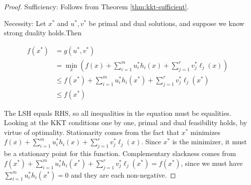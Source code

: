 \begin{proof}

    Sufficiency: Follows from Theorem \ref{thm:kkt-sufficient}.


    Necessity: Let $ x^{*} $ and $ u^{*}, v^{*} $ be primal and dual solutions, and suppose we know strong duality holds.Then

    \begin{equation}
    \begin{aligned}
    f\left(x^{*}\right) &=g\left(u^{*}, v^{*}\right) \\
    &=\min _{x}\left(f(x)+\sum_{i=1}^{m} u_{i}^{*} h_{i}(x)+\sum_{j=1}^{r} v_{j}^{*} \ell_{j}(x)\right) \\
    & \leq f\left(x^{*}\right)+\sum_{i=1}^{m} u_{i}^{*} h_{i}\left(x^{*}\right)+\sum_{j=1}^{r} v_{j}^{*} \ell_{j}\left(x^{*}\right) \\
    & \leq f\left(x^{*}\right)
    \end{aligned}
    \end{equation}

The LSH equals RHS, so all inequalities in the equation must be equalities. Looking at the KKT conditions one by one, primal and dual feasibility holds, by virtue of optimality. Stationarity comes from the fact that $ x^{*} $ minimizes $ f(x)+\sum_{i=1}^{m} u_{i}^{*} h_{i}(x)+\sum_{j=1}^{r} v_{j}^{*} \ell_{j}(x) $. Since $ x^{*} $ is the minimizer, it must be a stationary point for this function. Complementary slackness comes from $ f\left(x^{*}\right)+\sum_{i=1}^{m} u_{i}^{*} h_{i}\left(x^{*}\right)+\sum_{j=1}^{r} v_{j}^{*} \ell_{j}\left(x^{*}\right)=f\left(x^{*}\right) $, since we must have $ \sum_{i=1}^{m} u_{i}^{*} h_{i}\left(x^{*}\right)=0 $ and they are each non-negative.

\end{proof}